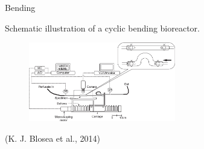 \documentclass[11pt,t]{beamer}
\begin{document}
\begin{frame}[fragile]{Bending}  

		 	Schematic illustration of a cyclic bending bioreactor.

			\begin{figure}
			\centering
			\includegraphics[width=0.57\textwidth]{mech_bending}
			
			\end{figure}
	\footnotesize(K. J. Blosea et al., 2014)

\end{frame}
\end{document}

